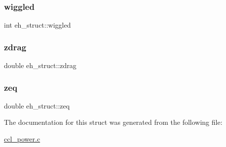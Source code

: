 \subsubsection{\texorpdfstring{wiggled}{wiggled}}
{\footnotesize\ttfamily int eh\+\_\+struct\+::wiggled}

\mbox{\label{structeh__struct_af3d1d22e42cdf316b3572a9149d98596}} 
\subsubsection{\texorpdfstring{zdrag}{zdrag}}
{\footnotesize\ttfamily double eh\+\_\+struct\+::zdrag}

\mbox{\label{structeh__struct_a115be04402be00203663cbf0cdeb6ccc}} 
\subsubsection{\texorpdfstring{zeq}{zeq}}
{\footnotesize\ttfamily double eh\+\_\+struct\+::zeq}



The documentation for this struct was generated from the following file\+:\begin{DoxyCompactItemize}
\item 
\mbox{\hyperlink{ccl__power_8c}{ccl\+\_\+power.\+c}}\end{DoxyCompactItemize}
